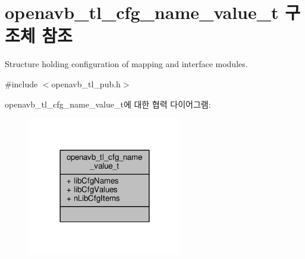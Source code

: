 \hypertarget{structopenavb__tl__cfg__name__value__t}{}\section{openavb\+\_\+tl\+\_\+cfg\+\_\+name\+\_\+value\+\_\+t 구조체 참조}
\label{structopenavb__tl__cfg__name__value__t}


Structure holding configuration of mapping and interface modules.  




{\ttfamily \#include $<$openavb\+\_\+tl\+\_\+pub.\+h$>$}



openavb\+\_\+tl\+\_\+cfg\+\_\+name\+\_\+value\+\_\+t에 대한 협력 다이어그램\+:
\nopagebreak
\begin{figure}[H]
\begin{center}
\leavevmode
\includegraphics[width=192pt]{structopenavb__tl__cfg__name__value__t__coll__graph}
\end{center}
\end{figure}
